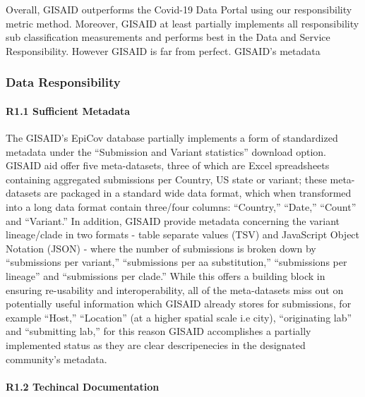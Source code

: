 \documentclass{article}
\begin{document}
Overall, GISAID outperforms the Covid-19 Data Portal using our
responsibility metric method. Moreover, GISAID at least partially
implements all responsibility sub classification measurements and
performs best in the Data and Service Responsibility. However GISAID is
far from perfect. GISAID's metadata

\hypertarget{data-responsibility-1}{%
\subsubsection{Data Responsibility}\label{data-responsibility-1}}

\hypertarget{r1.1-sufficient-metadata}{%
\paragraph{R1.1 Sufficient Metadata}\label{r1.1-sufficient-metadata}}

The GISAID's EpiCov database partially implements a form of standardized
metadata under the ``Submission and Variant statistics'' download
option. GISAID aid offer five meta-datasets, three of which are Excel
spreadsheets containing aggregated submissions per Country, US state or
variant; these meta-datasets are packaged in a standard wide data
format, which when transformed into a long data format contain
three/four columns: ``Country,'' ``Date,'' ``Count'' and ``Variant.'' In
addition, GISAID provide metadata concerning the variant lineage/clade
in two formats - table separate values (TSV) and JavaScript Object
Notation (JSON) - where the number of submissions is broken down by
``submissions per variant,'' ``submissions per aa substitution,''
``submissions per lineage'' and ``submissions per clade.'' While this
offers a building block in ensuring re-usability and interoperability,
all of the meta-datasets miss out on potentially useful information
which GISAID already stores for submissions, for example ``Host,''
``Location'' (at a higher spatial scale i.e city), ``originating lab''
and ``submitting lab,'' for this reason GISAID accomplishes a partially
implemented status as they are clear descripenecies in the designated
community's metadata.

\hypertarget{r1.2-techincal-documentation}{%
\paragraph{R1.2 Techincal
Documentation}\label{r1.2-techincal-documentation}}
\end{document}
